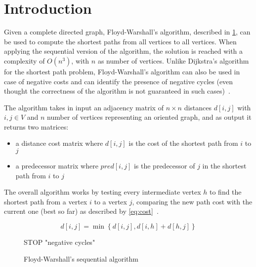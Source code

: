 \section{Introduction}\label{introduction}

Given a complete directed  graph, Floyd-Warshall's algorithm, described in \cref{alg:sequential}, can be used to compute the shortest paths from all vertices to all vertices.
When applying the sequential version of the algorithm, the solution is reached with a complexity of \(O(n^3)\), with \(n\) as number of vertices.
Unlike Dijkstra's algorithm for the shortest path problem, Floyd-Warshall's algorithm can also be used in case of negative costs and can identify the presence of negative cycles 
(even thought the correctness of the algorithm is not guaranteed in such cases)~\cite{fischetti}.

The algorithm takes in input an adjacency matrix of $n \times n$  distances $d[i,j]$ with $i,j \in V$ and $n$ number of vertices representing an oriented graph, and as output it returns two matrices:
\begin{itemize}
    \item a distance cost matrix where \(d[i,j]\) is the cost of the shortest path from \(i\) to \(j\)
    \item a predecessor matrix where \(pred[i,j]\) is the predecessor of \(j\) in the shortest path from \(i\) to \(j\)
  \end{itemize}

The overall algorithm works by testing every intermediate vertex \(h\) to find the shortest path from a vertex \(i\) to a vertex \(j\),
comparing the new path cost with the current one (best so far) as described by \cref{eq:cost}~\cite{fischetti}.

\begin{equation} \label{eq:cost}
    d[i,j] = \min\left\{ d[i,j], d[i,h]+d[h,j] \right\}
\end{equation}

\begin{figure}[htbp]
    \centering
    \begin{minipage}{.5\textwidth}
        \begin{algorithm}[H]
     { \label{alg:for-h}
         { \label{alg:for-i}
        }
         {
             {
                STOP  "negative cycles"
            }
        }
    }
\caption{Floyd-Warshall's sequential algorithm}
\label{alg:sequential}
\end{algorithm}
    \end{minipage}
\end{figure}

